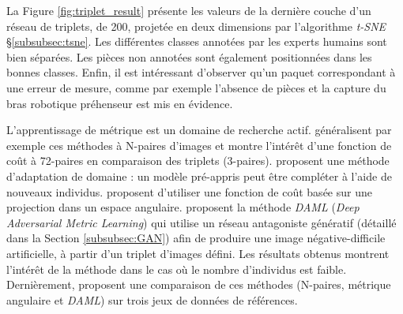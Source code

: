 La Figure \ref{fig:triplet_result} présente les valeurs de la dernière couche d'un réseau de triplets, de 200, projetée en deux dimensions par l'algorithme \textit{t-SNE} §\ref{subsubsec:tsne}.
Les différentes classes annotées par les experts humains sont bien séparées.
Les pièces non annotées sont également positionnées dans les bonnes classes.
Enfin, il est intéressant d'observer qu'un paquet correspondant à une erreur de mesure, comme par exemple l'absence de pièces et la capture du bras robotique préhenseur est mis en évidence.

L'apprentissage de métrique est un domaine de recherche actif.
\citeauthor{sohn_improved_2016} \cite{sohn_improved_2016} généralisent par exemple ces méthodes à N-paires d'images et montre l'intérêt d'une fonction de coût à 72-paires en comparaison des triplets (3-paires).
\citeauthor{song_deep_2015} \cite{song_deep_2015} proposent une méthode d'adaptation de domaine : un modèle pré-appris peut être compléter à l'aide de nouveaux individus.
\cite{wang_deep_2017} \citeauthor{wang_deep_2017} proposent d'utiliser une fonction de coût basée sur une projection dans un espace angulaire.
\citeauthor{duan_deep_2018} \cite{duan_deep_2018} proposent la méthode \textit{DAML} (\textit{Deep Adversarial Metric Learning}) qui utilise un réseau antagoniste génératif (détaillé dans la Section \ref{subsubsec:GAN}) afin de produire une image négative-difficile artificielle, à partir d'un triplet d'images défini.
Les résultats obtenus montrent l'intérêt de la méthode dans le cas où le nombre d'individus est faible.
Dernièrement, \citeauthor{zheng_hardness-aware_2019} \cite{zheng_hardness-aware_2019} proposent une comparaison de ces méthodes (N-paires, métrique angulaire et \textit{DAML}) sur trois jeux de données de références.






